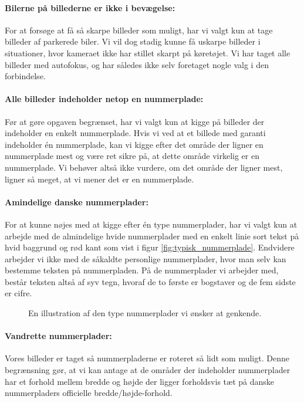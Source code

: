 \paragraph{Bilerne på billederne er ikke i bevægelse:}
For at forsøge at få så skarpe billeder som muligt, har vi valgt kun at tage billeder af parkerede biler. Vi vil dog stadig kunne få uskarpe billeder i situationer, hvor kameraet ikke har stillet skarpt på køretøjet. Vi har taget alle billeder med autofokus, og har således ikke selv foretaget nogle valg i den forbindelse.

\paragraph{Alle billeder indeholder netop en nummerplade:}
Før at gøre opgaven begrænset, har vi valgt kun at kigge på billeder der indeholder en enkelt nummerplade. Hvis vi ved at et billede med garanti indeholder én nummerplade, kan vi kigge efter det område der ligner en nummerplade mest og være ret sikre på, at dette område virkelig er en nummerplade. Vi behøver altså ikke vurdere, om det område der ligner mest, ligner så meget, at vi mener det er en nummerplade.

\paragraph{Amindelige danske nummerplader:}
For at kunne nøjes med at kigge efter én type nummerplader, har vi valgt kun at arbejde med de almindelige hvide nummerplader med en enkelt linie sort tekst på hvid baggrund og rød kant som vist i figur \vref{fig:typisk_nummerplade}. Endvidere arbejder vi ikke med de såkaldte personlige nummerplader, hvor man selv kan bestemme teksten på nummerpladen. På de nummerplader vi arbejder med, består teksten altså af syv tegn, hvoraf de to første er bogstaver og de fem sidste er cifre.

\begin{figure}[htp]
\centering
{} 
\caption{En illustration af den type nummerplader vi ønsker at genkende.}
\label{fig:typisk_nummerplade}
\end{figure}

\paragraph{Vandrette nummerplader:}
Vores billeder er taget så nummerpladerne er roteret så lidt som muligt. Denne begrænsning gør, at vi kan antage at de områder der indeholder nummerplader har et forhold mellem bredde og højde der ligger forholdsvis tæt på danske nummerpladers officielle bredde/højde-forhold.

